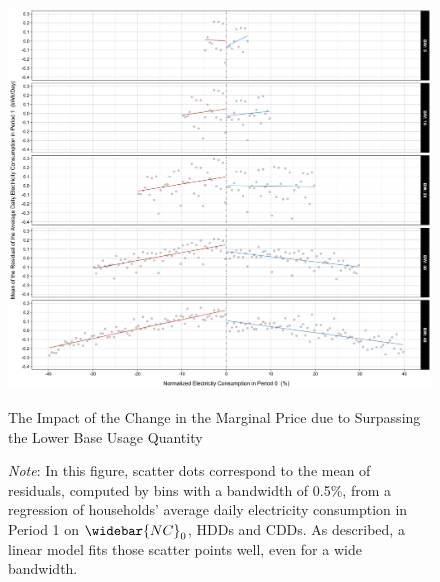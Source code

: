     \begin{figure}[ht!]
        \centering
        \includegraphics[scale = 0.120]{02_Chapter-1/00A_Figures/Figure_Residuals-of-the-Average-Daily-Electricity-Consumption-in-Period-0-over-NC0_From-BW5-to-BW40.png}
        \caption{The Impact of the Change in the Marginal Price due to Surpassing the Lower Base Usage Quantity}
        \caption*{
            {\small
            \textit{Note}: 
            In this figure, scatter dots correspond to the mean of residuals, computed by bins with a bandwidth of 0.5\%, from a regression of households' average daily electricity consumption in Period 1 on $\widebar{NC}_{0}$, HDDs and CDDs. As described, a linear model fits those scatter points well, even for a wide bandwidth. 
        }}
        \label{Figure:The-Impact-of-the-Change-in-the-MP-due-to-Surpassing-the-Lower-BUQ}
    \end{figure}
\clearpage




\clearpage


\clearpage


\clearpage
